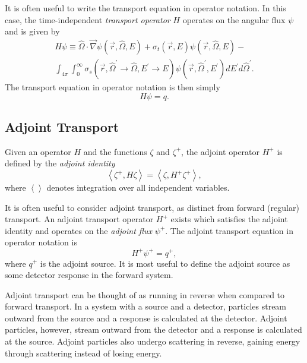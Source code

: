 It is often useful to write the transport equation in operator notation.
In this case, the time-independent \textit{transport operator} $H$ operates on the angular flux $\psi$ and is given by
\begin{multline}\label{eq:bg:rt:transport_operator}
  H\psi \equiv
  \hat{\Omega}\cdot\vec{\nabla}\psi\left(\vec{r},\hat{\Omega},E\right) +
  \sigma_t\left(\vec{r},E\right)\psi\left(\vec{r},\hat{\Omega},E\right) - \\
  \int_{4\pi}\int_0^\infty\sigma_s\left(\vec{r},\hat{\Omega}^\prime\rightarrow\hat{\Omega},E^\prime\rightarrow E\right)\psi\left(\vec{r},\hat{\Omega}^\prime,E^\prime\right)dE^\prime d\hat{\Omega}^\prime.
\end{multline}
The transport equation in operator notation is then simply
\begin{equation}\label{eq:bg:rt:transport_equation_operator_notation}
  H\psi = q.
\end{equation}

\subsection{Adjoint Transport}
\label{sec:bg:rt:at}

Given an operator $H$ and the functions $\zeta$ and $\zeta^+$, the adjoint operator $H^+$ is defined by the \textit{adjoint identity}
\begin{equation}\label{eq:bg:rt:adjoint_identity}
  \left<\zeta^+,H\zeta\right> =
  \left<\zeta,H^+\zeta^+\right>,
\end{equation}
where $\left<\right>$ denotes integration over all independent variables.

It is often useful to consider adjoint transport, as distinct from forward (regular) transport.
An adjoint transport operator $H^+$ exists which satisfies the adjoint identity and operates on the \textit{adjoint flux} $\psi^+$.
The adjoint transport equation in operator notation is
\begin{equation}\label{eq:bg:rt:adjoint_transport_equation_operator_notation}
  H^+\psi^+ = q^+,
\end{equation}
where $q^+$ is the adjoint source.
It is most useful to define the adjoint source as some detector response in the forward system.

Adjoint transport can be thought of as running in reverse when compared to forward transport.
In a system with a source and a detector, particles stream outward from the source and a response is calculated at the detector.
Adjoint particles, however, stream outward from the detector and a response is calculated at the source.
Adjoint particles also undergo scattering in reverse, gaining energy through scattering instead of losing energy.

